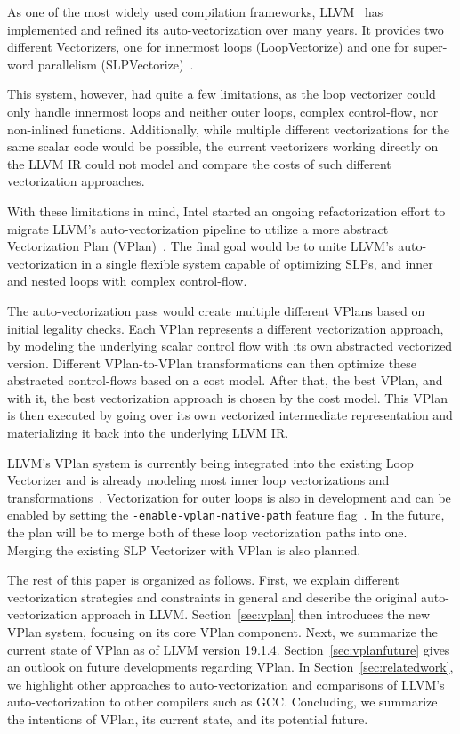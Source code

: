 \documentclass[sigplan,11pt,nonacm]{acmart}
\begin{document}
As one of the most widely used compilation frameworks, LLVM~\cite{10.5555/977395.977673} has 
implemented and refined its auto-vectorization over many years. It provides two different 
Vectorizers, one for innermost loops (LoopVectorize) and one for super-word parallelism 
(SLPVectorize)~\cite{llvmvec}.

This system, however, had quite a few limitations, as the loop vectorizer could only handle
innermost loops and neither outer loops, complex control-flow, nor non-inlined functions. 
Additionally, while multiple different vectorizations for the same scalar code 
would be possible, the current vectorizers working directly on the LLVM IR could not model
and compare the costs of such different vectorization approaches.

With these limitations in mind, Intel started an ongoing refactorization effort to migrate LLVM's
auto-vectorization pipeline to utilize a more abstract Vectorization Plan 
(VPlan)~\cite{llvmextloopvec,llvmvplan}. The final goal would be to unite LLVM's auto-vectorization
in a single flexible system capable of optimizing SLPs, and inner and nested loops with complex 
control-flow.

The auto-vectorization pass would create multiple different VPlans based on initial legality 
checks. Each VPlan represents a different vectorization approach, by modeling the
underlying scalar control flow with its own abstracted vectorized version. Different VPlan-to-VPlan
transformations can then optimize these abstracted control-flows based on a cost model.
After that, the best VPlan, and with it, the best vectorization approach is chosen by the cost model.
This VPlan is then executed by going over its own vectorized intermediate representation and
materializing it back into the underlying LLVM IR.

LLVM's VPlan system is currently being integrated into the existing Loop Vectorizer and is
already modeling most inner loop vectorizations and transformations~\cite{llvmvplanupdate}. 
Vectorization for outer loops is also in development and can be enabled by setting 
the \texttt{-enable-\allowbreak vplan-\allowbreak native-\allowbreak path} feature 
flag~\cite{llvmouterloop,llvmouterloopstatus}. 
In the future, the plan will be to merge both of these loop vectorization paths into one. 
Merging the existing SLP Vectorizer with VPlan is also planned.

The rest of this paper is organized as follows. First, we explain different vectorization
strategies and constraints in general and describe the original auto-vectorization
approach in LLVM. Section~\ref{sec:vplan} then introduces the new VPlan system, focusing on
its core VPlan component. Next, we summarize the current state of VPlan as of LLVM version 19.1.4.
Section~\ref{sec:vplanfuture} gives an outlook on future developments regarding VPlan. In 
Section~\ref{sec:relatedwork}, we highlight other approaches to auto-vectorization and 
comparisons of LLVM's auto-vectorization to other compilers such as GCC. 
Concluding, we summarize the intentions of VPlan, its current state, and its potential future.
\end{document}
